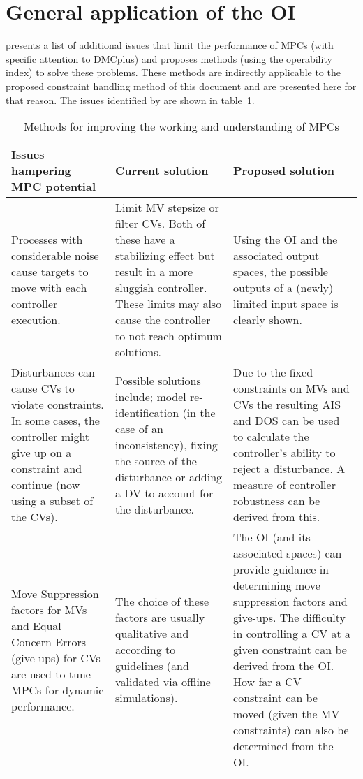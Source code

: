 \section{General application of the OI}
\citet{vinsonphd} presents a list of additional issues that limit the performance of MPCs (with specific attention to DMCplus) and proposes methods (using the operability index) to solve these problems. 
These methods are indirectly applicable to the proposed constraint handling method of this document and are presented here for that reason. 
The issues identified by \citet{vinsonphd} are shown in table~\ref{tab:mpcissues}.
\begin{landscape}
\hfill
\begin{table}[htbp]
  \caption[Methods for improving the working and understanding of MPCs]
    {Methods for improving the working and understanding of MPCs \citep{vinsonphd}}
  \label{tab:mpcissues}
  \centering
  \begin{tabular}{p{8cm} p{8cm} p{8cm}}
    \toprule
    Issues hampering MPC potential & Current solution & Proposed solution \\
    \midrule
Processes with considerable noise cause targets to move with each controller execution.
& Limit MV stepsize or filter CVs. 
Both of these have a stabilizing effect but result in a more sluggish controller. 
These limits may also cause the controller to not reach optimum solutions.
& Using the OI and the associated output spaces, the possible outputs of a (newly) limited input space is clearly shown.\\[1.3ex]
    
Disturbances can cause CVs to violate constraints. 
In some cases, the controller might give up on a constraint and continue (now using a subset of the CVs).
& Possible solutions include; model re-identification (in the case of an inconsistency), fixing the source of the disturbance or adding a DV to account for the disturbance.
& Due to the fixed constraints on MVs and CVs the resulting AIS and DOS can be used to calculate the controller's ability to reject a disturbance. 
A measure of controller robustness can be derived from this.\\[1.3ex]
    
Move Suppression factors for MVs and Equal Concern Errors (give-ups) for CVs are used to tune MPCs for dynamic performance.
& The choice of these factors are usually qualitative and according to guidelines (and validated via offline simulations).
& The OI (and its associated spaces) can provide guidance in determining move suppression factors and give-ups. 
The difficulty in controlling a CV at a given constraint can be derived from the OI. 
How far a CV constraint can be moved (given the MV constraints) can also be determined from the OI.\\
    \bottomrule
  \end{tabular}
\end{table}
\hfill
\end{landscape}

